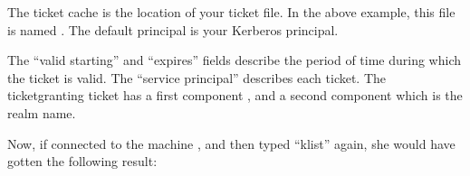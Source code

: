 \documentclass[letterpaper,10pt,english]{sphinxmanual}
\begin{document}
\begin{sphinxVerbatim}[commandchars=\\\{\}]
 
  
  

                   
      
\end{sphinxVerbatim}

\sphinxAtStartPar
The ticket cache is the location of your ticket file. In the above
example, this file is named . The default
principal is your Kerberos principal.

\sphinxAtStartPar
The “valid starting” and “expires” fields describe the period of time
during which the ticket is valid.  The “service principal” describes
each ticket.  The ticket\sphinxhyphen{}granting ticket has a first component
, and a second component which is the realm name.

\sphinxAtStartPar
Now, if  connected to the machine ,
and then typed “klist” again, she would have gotten the following
result:
\end{document}
